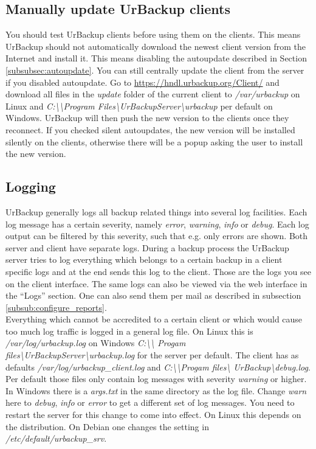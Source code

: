 \documentclass[a4paper,10pt]{article}
\begin{document}
\subsection{Manually update UrBackup clients}
\label{subsec:manually_update_client}

You should test UrBackup clients before using them on the clients. This means
UrBackup should not automatically download the newest client version from
the Internet and install it. This means disabling the autoupdate described in
Section \ref{subsubsec:autoupdate}. You can still centrally update the client
from the server if you disabled autoupdate. Go to \url{https://hndl.urbackup.org/Client/}
and download all files in the \textsl{update} folder of the current client to \textsl{/var/urbackup} on Linux and
\textsl{C:\textbackslash\textbackslash Program Files\textbackslash UrBackupServer\textbackslash urbackup} per default on Windows. UrBackup
will then push the new version to the clients once they reconnect. If you checked
silent autoupdates, the new version will be installed silently on the clients, otherwise
there will be a popup asking the user to install the new version.

\subsection{Logging}
\label{sec:logging}

UrBackup generally logs all backup related things into several log facilities.
Each log message has a certain severity, namely \textsl{error},
\textsl{warning}, \textsl{info} or \textsl{debug}.
Each log output can be filtered by this severity, such that e.g. only errors are
shown. Both server and client have separate logs. During a backup process the
UrBackup server tries to log everything which belongs to a certain backup in a
client specific logs and at the end sends this log to the client. Those are the
logs you see on the client interface. The same logs can also be viewed via the
web interface in the ``Logs'' section. One can also send them per mail as
described in subsection \ref{subsub:configure_reports}.\\
Everything which cannot be accredited to a certain client or which would cause
too much log traffic is logged in a general log file. On Linux this is
\textsl{/var/log/urbackup.log} on Windows \textsl{C:\textbackslash\textbackslash
Progam files\textbackslash UrBackupServer\textbackslash urbackup.log} for the
server per default.  The client has as defaults
\textsl{/var/log/urbackup\_client.log} and
\textsl{C:\textbackslash\textbackslash Progam files\textbackslash
UrBackup\textbackslash debug.log}. Per default those files only contain log
messages with severity \textsl{warning} or higher. In Windows there is a
\textsl{args.txt} in the same directory as the log file. Change \textsl{warn}
here to \textsl{debug}, \textsl{info} or \textsl{error} to get a different set
of log messages. You need to restart the server for this change to come into
effect. On Linux this depends on the distribution. On Debian one changes the
setting in \textsl{/etc/default/urbackup\_srv}.
\end{document}
